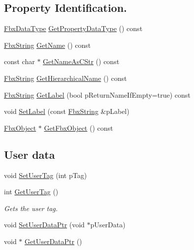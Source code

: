 \subsection*{Property Identification.}
\begin{DoxyCompactItemize}
\item 
\hyperlink{class_fbx_data_type}{Fbx\+Data\+Type} \hyperlink{class_fbx_property_a62565770177152f06d82c745e0811b84}{Get\+Property\+Data\+Type} () const
\item 
\hyperlink{class_fbx_string}{Fbx\+String} \hyperlink{class_fbx_property_ad4505c67d892b22bb40ba5e9c5b4a844}{Get\+Name} () const
\item 
const char $\ast$ \hyperlink{class_fbx_property_af2f3725b832d70596008f895950c2235}{Get\+Name\+As\+C\+Str} () const
\item 
\hyperlink{class_fbx_string}{Fbx\+String} \hyperlink{class_fbx_property_a6045fdbb1bbe5a84f44c7f447d2fa52c}{Get\+Hierarchical\+Name} () const
\item 
\hyperlink{class_fbx_string}{Fbx\+String} \hyperlink{class_fbx_property_a6efe7b201b09f1694daa39d32ea2d7e1}{Get\+Label} (bool p\+Return\+Name\+If\+Empty=true) const
\item 
void \hyperlink{class_fbx_property_a8ceef24a4b0e5838895962aaf0ad07ae}{Set\+Label} (const \hyperlink{class_fbx_string}{Fbx\+String} \&p\+Label)
\item 
\hyperlink{class_fbx_object}{Fbx\+Object} $\ast$ \hyperlink{class_fbx_property_aaa3f53accde176da9528ec831fc95ec8}{Get\+Fbx\+Object} () const
\end{DoxyCompactItemize}
\subsection*{User data}
\begin{DoxyCompactItemize}
\item 
void \hyperlink{class_fbx_property_affbc6e79fd35b52606d84d4e6839725c}{Set\+User\+Tag} (int p\+Tag)
\item 
int \hyperlink{class_fbx_property_a346536ecdb6cc2178105ed4fc30b80fc}{Get\+User\+Tag} ()
\begin{DoxyCompactList}\small\item\em Gets the user tag. \end{DoxyCompactList}\item 
void \hyperlink{class_fbx_property_a36506608b92abf21707be1c06a6cac3b}{Set\+User\+Data\+Ptr} (void $\ast$p\+User\+Data)
\item 
void $\ast$ \hyperlink{class_fbx_property_a4d1057bd2c1b78585aad480c88a40a11}{Get\+User\+Data\+Ptr} ()
\end{DoxyCompactItemize}

